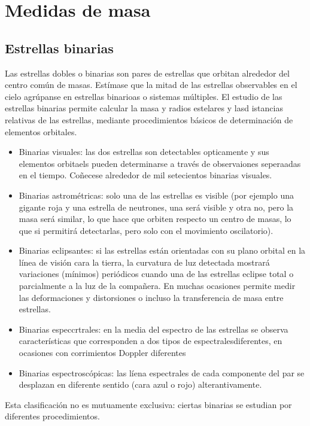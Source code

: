 \section{Medidas de masa}

\subsection{Estrellas binarias}

Las estrellas dobles o binarias son pares de estrellas que orbitan alrededor del centro común de masas. Estímase que la mitad de las estrellas observables en el cielo agrúpanse en estrellas binarioas o sistemas múltiples. El estudio de las estrellas binarias permite calcular la masa y radios estelares y lasd istancias relativas de las estrellas, mediante procedimientos básicos de determinación de elementos orbitales. 

\begin{itemize}
    \item Binarias visuales: las dos estrellas son detectables opticamente y sus elementos orbitaels pueden determinarse a través de observaiones seperaadas en el tiempo. Coñecese alrededor de mil setecientos binarias visuales.
    \item Binarias astrométricas: solo una de las estrellas es visible (por ejemplo una gigante roja y una estrella de neutrones, una será visible y otra no, pero la masa será similar, lo que hace que orbiten respecto un centro de masas, lo que si permitirá detectarlas, pero solo con el movimiento oscilatorio).
    \item Binarias eclipsantes: si las estrellas están orientadas con su plano orbital en la línea de visión cara la tierra, la curvatura de luz detectada mostrará variaciones (mínimos) periódicos cuando una de las estrellas eclipse total o parcialmente a la luz de la compañera. En muchas ocasiones permite medir las deformaciones y distorsiones o incluso la transferencia de masa entre estrellas. 
    \item Binarias especcrtrales: en la media del espectro de las estrellas se observa características que corresponden a dos tipos de espectralesdiferentes, en ocasiones con corrimientos Doppler diferentes
    \item Binarias espectroscópicas: las líena espectrales de cada componente del par se desplazan en diferente sentido (cara azul o rojo) alterantivamente. 
\end{itemize}
Esta clasificación no es mutuamente exclusiva: ciertas binarias se estudian por diferentes procedimientos.

